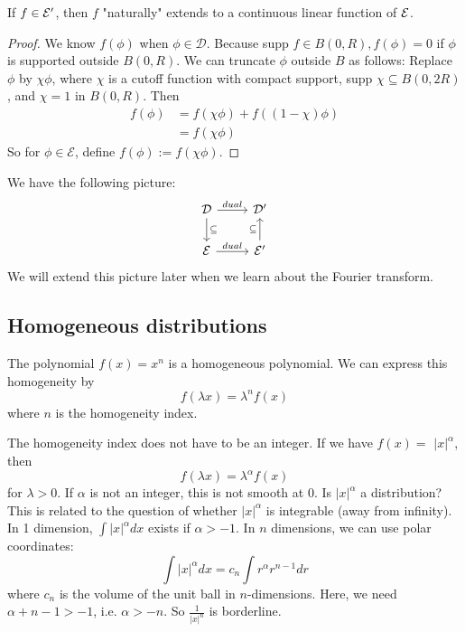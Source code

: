  \begin{proposition}
 If $f\in \mathcal{E}'$, then $f$ "naturally" extends to a continuous linear function of $\mathcal{E}$.
 \end{proposition}
 \begin{proof}
     We know $f(\phi)$ when $\phi \in \mathcal{D}$. Because supp $f \in B(0, R), f(\phi)=0$ if $\phi$ is supported outside $B(0, R)$. We can truncate $\phi$ outside $B$ as follows: Replace $\phi$ by $\chi \phi$, where $\chi$ is a cutoff function with compact support, supp $\chi \subseteq B(0,2 R)$, and $\chi=1$ in $B(0, R)$. Then
    $$
    \begin{aligned}
    f(\phi) &=f(\chi \phi)+f((1-\chi) \phi) \\
    &=f(\chi \phi)
    \end{aligned}
    $$
    So for $\phi \in \mathcal{E}$, define $f(\phi):=f(\chi \phi)$.
 \end{proof}
 We have the following picture: 
\[
    \begin{tikzcd}
        \cD \arrow[r,"dual"]
        \arrow[d, "\subseteq"] &\cD' \\
        \cE \arrow[r,"dual"] &\cE' \arrow[u,"\subseteq"] 
    \end{tikzcd}
\]
We will extend this picture later when we learn about the Fourier transform.

\subsection{Homogeneous distributions}
\begin{example}
    The polynomial $f(x)=x^{n}$ is a homogeneous polynomial. We can express this homogeneity by
    $$
    f(\lambda x)=\lambda^{n} f(x)
    $$
    where $n$ is the homogeneity index.
\end{example}

\begin{example}
    The homogeneity index does not have to be an integer. If we have $f(x)=$ $|x|^{\alpha}$, then
    $$
    f(\lambda x)=\lambda^{\alpha} f(x)
    $$
    for $\lambda>0$. If $\alpha$ is not an integer, this is not smooth at $0 .$ Is $|x|^{\alpha}$ a distribution? This is related to the question of whether $|x|^{\alpha}$ is integrable (away from infinity). In 1 dimension, $\int|x|^{\alpha} d x$ exists if $\alpha>-1 .$ In $n$ dimensions, we can use polar coordinates:
    $$
    \int|x|^{\alpha} d x=c_{n} \int r^{\alpha} r^{n-1} d r
    $$
    where $c_{n}$ is the volume of the unit ball in $n$-dimensions. Here, we need $\alpha+n-1>-1$, i.e. $\alpha>-n$. So $\frac{1}{|x|^{n}}$ is borderline.

\end{example}

